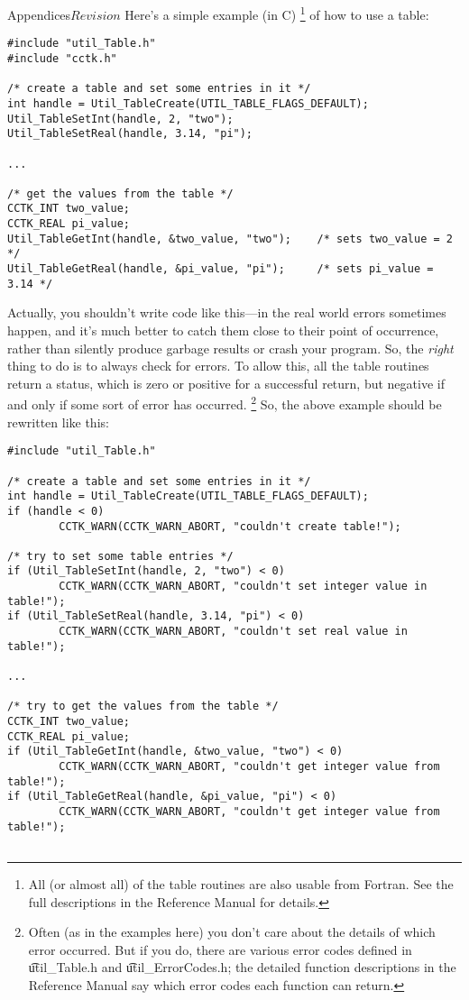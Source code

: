 \begin{cactuspart}{Appendices}{}{$Revision$}
Here's a simple example (in C)%
\footnote{%
	 All (or almost all) of the table routines
	 are also usable from Fortran.  See the full
	 descriptions in the Reference Manual
	 for details.
	 }%
{} of how to use a table:
\begin{verbatim}
#include "util_Table.h"
#include "cctk.h"

/* create a table and set some entries in it */
int handle = Util_TableCreate(UTIL_TABLE_FLAGS_DEFAULT);
Util_TableSetInt(handle, 2, "two");
Util_TableSetReal(handle, 3.14, "pi");

...

/* get the values from the table */
CCTK_INT two_value;
CCTK_REAL pi_value;
Util_TableGetInt(handle, &two_value, "two");    /* sets two_value = 2 */
Util_TableGetReal(handle, &pi_value, "pi");     /* sets pi_value = 3.14 */
\end{verbatim}

Actually, you shouldn't write code like this---in the real world
errors sometimes happen, and it's much better to catch them close to
their point of occurrence, rather than silently produce garbage results
or crash your program.  So, the \emph{right} thing to do is to always
check for errors.  To allow this, all the table routines return a status,
which is zero or positive for a successful return, but negative if
and only if some sort of error has occurred.%
\footnote{%
	 Often (as in the examples here) you don't care
	 about the details of which error occurred.  But if
	 you do, there are various error codes defined in
	 {\t util\_Table.h} and {\t util\_ErrorCodes.h};
	 the detailed function descriptions in
	 the Reference Manual
	 say which error codes each function can return.
	 }%
{}  So, the above example should be rewritten like this:

\begin{verbatim}
#include "util_Table.h"

/* create a table and set some entries in it */
int handle = Util_TableCreate(UTIL_TABLE_FLAGS_DEFAULT);
if (handle < 0)
        CCTK_WARN(CCTK_WARN_ABORT, "couldn't create table!");

/* try to set some table entries */
if (Util_TableSetInt(handle, 2, "two") < 0)
        CCTK_WARN(CCTK_WARN_ABORT, "couldn't set integer value in table!");
if (Util_TableSetReal(handle, 3.14, "pi") < 0)
        CCTK_WARN(CCTK_WARN_ABORT, "couldn't set real value in table!");

...

/* try to get the values from the table */
CCTK_INT two_value;
CCTK_REAL pi_value;
if (Util_TableGetInt(handle, &two_value, "two") < 0)
        CCTK_WARN(CCTK_WARN_ABORT, "couldn't get integer value from table!");
if (Util_TableGetReal(handle, &pi_value, "pi") < 0)
        CCTK_WARN(CCTK_WARN_ABORT, "couldn't get integer value from table!");


\end{verbatim}
\end{cactuspart}
